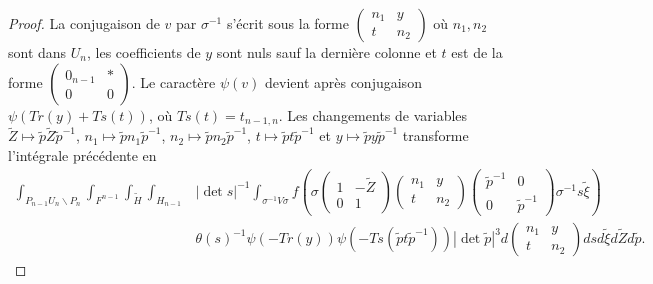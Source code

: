 \documentclass{amsart}
\begin{document}
\begin{proof}
La conjugaison de $v$ par $\sigma^{-1}$ s'écrit sous la forme $\begin{pmatrix}
n_1 & y \\
t & n_2
\end{pmatrix}$ où $n_1, n_2$ sont dans $U_n$, les coefficients de $y$ sont nuls sauf la dernière colonne et $t$ est de la forme $\begin{pmatrix}
0_{n-1} & * \\
0 & 0
\end{pmatrix}$. Le caractère $\psi(v)$ devient après conjugaison $\psi(Tr(y)+Ts(t))$, où $Ts(t) = t_{n-1,n}$. Les changements de variables $\tilde{Z} \mapsto \tilde{p}\tilde{Z}\tilde{p}^{-1}$, $n_1 \mapsto \tilde{p}n_1\tilde{p}^{-1}$, $n_2 \mapsto \tilde{p}n_2\tilde{p}^{-1}$,
$t \mapsto \tilde{p}t\tilde{p}^{-1}$ et $y \mapsto \tilde{p}y\tilde{p}^{-1}$ transforme l'intégrale précédente en
\begin{equation}
\begin{split}
\int_{P_{n-1}U_n\backslash{P_n}} \int_{F^{n-1}} \int_{\tilde{H}} \int_{H_{n-1}} & |\det s|^{-1}\int_{\sigma^{-1}V\sigma} f\left(\sigma \begin{pmatrix}
1 & -\tilde{Z} \\
0 & 1
\end{pmatrix}  \begin{pmatrix}
n_1 & y \\
t & n_2
\end{pmatrix} \begin{pmatrix}
\tilde{p}^{-1} & 0 \\
0 & \tilde{p}^{-1}
\end{pmatrix} \sigma^{-1} s \tilde{\xi}\right) \\
& \theta(s)^{-1} \psi(-Tr(y)) \psi(-Ts(\tilde{p}t\tilde{p}^{-1}))|\det \tilde{p}|^3  d\begin{pmatrix}
n_1 & y \\
t & n_2
\end{pmatrix} ds d\tilde{\xi} d\tilde{Z} d\tilde{p}.
\end{split}
\end{equation}


\end{proof}
\end{document}
